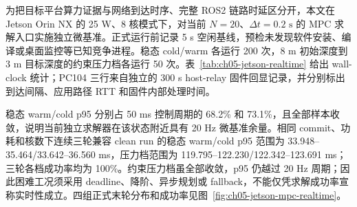 为把目标平台算力证据与网络到达时序、完整 ROS2 链路时延区分开，本文在 Jetson Orin NX 的 25 W、8 核模式下，对当前 \(N=20\)、\(\Delta t=0.2\text{ s}\) 的 MPC 求解入口实施独立微基准。正式运行前记录 5 s 空闲基线，预检未发现软件安装、编译或桌面监控等已知竞争进程。稳态 cold/warm 各运行 200 次，\(8\text{ m}\) 初始深度到 \(3\text{ m}\) 目标深度的约束压力档各运行 50 次。表~\ref{tab:ch05-jetson-realtime} 给出 wall-clock 统计；PC104 三行来自独立的 300 s host-relay 固件回显记录，并分别标出到达间隔、应用路径 RTT 和固件内部处理时间。

\begin{table}[htbp]
\centering
\scriptsize
\setlength{\tabcolsep}{2.7pt}
\caption{Jetson Orin NX 求解器微基准与 PC104 固件回显时序}\label{tab:ch05-jetson-realtime}
\end{table}

稳态 warm/cold p95 分别占 50 ms 控制周期的 68.2\% 和 73.1\%，且全部样本收敛，说明当前独立求解器在该状态附近具有 20 Hz 微基准余量。相同 commit、功耗和核数下连续三轮兼容 clean run 的稳态 warm/cold p95 范围为 33.948--35.464/33.642--36.560 ms，压力档范围为 119.795--122.230/122.342--123.691 ms；三轮各档成功率均为 100\%。约束压力档虽全部收敛，p95 仍越过 20 Hz 周期；因此困难工况须采用 deadline、降阶、异步规划或 fallback，不能仅凭求解成功率宣称实时性成立。四组正式末轮分布和成功率见图~\ref{fig:ch05-jetson-mpc-realtime}。

